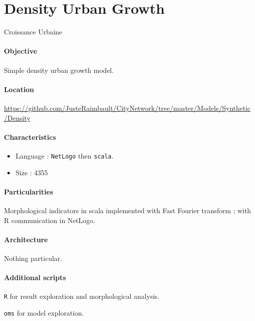 \section{Density Urban Growth}{Croissance Urbaine}

\paragraph{Objective}

Simple density urban growth model.

\paragraph{Location}

\url{https://github.com/JusteRaimbault/CityNetwork/tree/master/Models/Synthetic/Density}

\paragraph{Characteristics}

\begin{itemize}
\item Language : \texttt{NetLogo} then \texttt{scala}.
\item Size : 4355
\end{itemize}


\paragraph{Particularities}

Morphological indicators in scala implemented with Fast Fourier transform ; with R communication in NetLogo.

\paragraph{Architecture}

Nothing particular.

\paragraph{Additional scripts}

\texttt{R} for result exploration and morphological analysis.

\texttt{oms} for model exploration.





